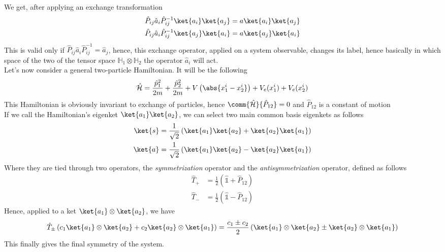\documentclass[a4paper, 11pt]{book}
\newcommand{\1}{\opr{\mathds{1}}}
\newcommand{\ham}{\mathcal{H}}
\newcommand{\opr}[1]{\hat{#1}}
\newcommand{\ladopru}[1]{\opr{#1}_{+}}
\newcommand{\ladoprd}[1]{\opr{#1}_{-}}
\newcommand{\ladoprpm}[1]{\opr{#1}_{\pm}}
\newcommand{\hilbert}{\mathbb{H}}
\theoremstyle{plain}
\begin{document}
	We get, after applying an exchange transformation
	\begin{equation*}
		\begin{aligned}
			\opr{P}_{ij}\opr{a}_i\opr{P}_{ij}^{-1}\ket{a_i}\ket{a_j}&=a\ket{a_i}\ket{a_j}\\
			\opr{P}_{ij}\opr{a}_i\opr{P}_{ij}^{-1}\ket{a_j}\ket{a_i}&=a\ket{a_j}\ket{a_i}
		\end{aligned}
	\end{equation*}
	This is valid only if $\opr{P}_{ij}\opr{a}_i\opr{P}_{ij}^{-1}=\opr{a}_j$, hence, this exchange operator, applied on a system observable, changes its label, hence basically in which space of the two of the tensor space $\hilbert_1\otimes\hilbert_2$ the operator $\opr{a}_i$ will act.\\
	Let's now consider a general two-particle Hamiltonian. It will be the following
	\begin{equation}
		\opr{\ham}=\frac{\opr{p}^2_1}{2m}+\frac{\opr{p}^2_2}{2m}+V\left(\abs{x^i_1-x^i_2}\right)+V_e(x_1^i)+V_e(x_2^i)
		\label{eq:2parthamiltonian}
	\end{equation}
	This Hamiltonian is obviously invariant to exchange of particles, hence $\comm{\opr{\ham}}{\opr{P}_{12}}=0$ and $\opr{P}_{12}$ is a constant of motion\\
	If we call the Hamiltonian's eigenket $\ket{a_1}\ket{a_2}$, we can select two main common basis eigenkets as follows
	\begin{equation*}
		\begin{aligned}
			\ket{s}&=\frac{1}{\sqrt{2}}\left( \ket{a_1}\ket{a_2}+\ket{a_2}\ket{a_1} \right)\\
			\ket{a}&=\frac{1}{\sqrt{2}}\left( \ket{a_1}\ket{a_2}-\ket{a_2}\ket{a_1} \right)
		\end{aligned}
	\end{equation*}
	Where they are tied through two operators, the \textit{symmetrization} operator and the \textit{antisymmetrization} operator, defined as follows
	\begin{equation}
		\begin{aligned}
			\ladopru{T}&=\frac{1}{2}\left( \1+\opr{P}_{12} \right)\\
			\ladoprd{T}&=\frac{1}{2}\left( \1-\opr{P}_{12} \right)
		\end{aligned}
		\label{eq:antisimmsimmopr}
	\end{equation}
	Hence, applied to a ket $\ket{a_1}\otimes\ket{a_2}$, we have
	\begin{equation*}
		\ladoprpm{T}\left( c_1\ket{a_1}\otimes\ket{a_2}+c_2\ket{a_2}\otimes\ket{a_1} \right)=\frac{c_1\pm c_2}{2}\left( \ket{a_1}\otimes\ket{a_2}\pm\ket{a_2}\otimes\ket{a_1} \right)
	\end{equation*}
	This finally gives the final symmetry of the system.
\end{document}
